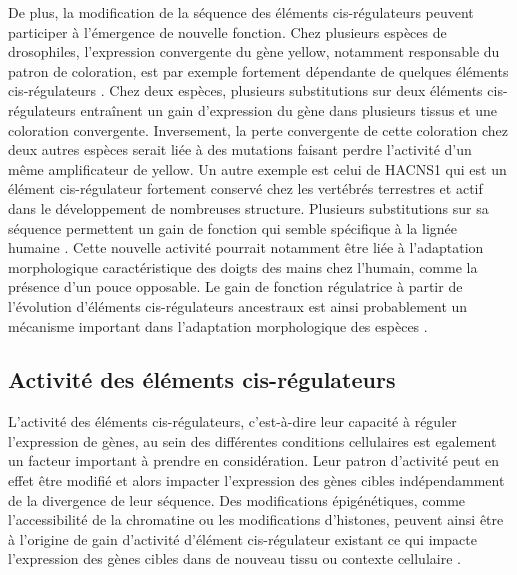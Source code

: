 De plus, la modification de la séquence des éléments \gls{cis}-régulateurs peuvent participer à l’émergence de nouvelle fonction. Chez plusieurs espèces de drosophiles, l’expression convergente du gène yellow, notamment responsable du patron de coloration, est par exemple fortement dépendante de quelques éléments \gls{cis}-régulateurs \citep{prudhomme_repeated_2006}. Chez deux espèces, plusieurs substitutions sur deux éléments \gls{cis}-régulateurs entraînent un gain d’expression du gène dans plusieurs tissus et une coloration convergente. Inversement, la perte convergente de cette coloration chez deux autres espèces serait liée à des mutations faisant perdre l'activité d’un même \gls{amplificateur} de yellow. Un autre exemple est celui de HACNS1 qui est un élément \gls{cis}-régulateur fortement conservé chez les vertébrés terrestres et actif dans le développement de nombreuses structure. Plusieurs substitutions sur sa séquence permettent un gain de fonction qui semble spécifique à la lignée humaine \citep{prabhakar_human-specific_2008}. Cette nouvelle activité pourrait notamment être liée à l’adaptation morphologique caractéristique des doigts des mains chez l’humain, comme la présence d’un pouce opposable. Le gain de fonction régulatrice à partir de l’évolution d’éléments \gls{cis}-régulateurs ancestraux est ainsi probablement un mécanisme important dans l’adaptation morphologique des espèces \citep{koshikawa_enhancer_2015}.

\subsection{Activité des éléments \gls{cis}-régulateurs}
\label{subsec:evol-seq-enh}

L’activité des éléments \gls{cis}-régulateurs, c’est-à-dire leur capacité à réguler l’expression de gènes, au sein des différentes \glspl{condition} cellulaires est egalement un facteur important à prendre en considération. Leur patron d’activité peut en effet être modifié et alors impacter l’expression des gènes cibles indépendamment de la divergence de leur séquence. Des modifications épigénétiques, comme l’accessibilité de la chromatine ou les modifications d’histones, peuvent ainsi être à l’origine de gain d’activité d’élément \gls{cis}-régulateur existant ce qui impacte l’expression des gènes cibles dans de nouveau tissu ou contexte cellulaire \citep{rebeiz_evolutionary_2011, xin_enhancer_2020}. \\

